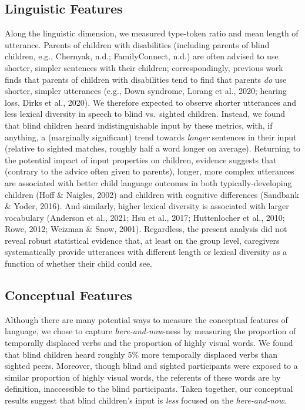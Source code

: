 \documentclass[
  man,floatsintext]{apa6}
\begin{document}
\hypertarget{linguistic-features-2}{%
\subsection{Linguistic Features}\label{linguistic-features-2}}

Along the linguistic dimension, we measured type-token ratio and mean length of utterance. Parents of children with disabilities (including parents of blind children, e.g., Chernyak, n.d.; FamilyConnect, n.d.) are often advised to use shorter, simpler sentences with their children; correspondingly, previous work finds that parents of children with disabilities tend to find that parents \emph{do} use shorter, simpler utterances (e.g., Down syndrome, Lorang et al., 2020; hearing loss, Dirks et al., 2020). We therefore expected to observe shorter utterances and less lexical diversity in speech to blind vs.~sighted children. Instead, we found that blind children heard indistinguishable input by these metrics, with, if anything, a (marginally significant) trend towards \emph{longer} sentences in their input (relative to sighted matches, roughly half a word longer on average). Returning to the potential impact of input properties on children, evidence suggests that (contrary to the advice often given to parents), longer, more complex utterances are associated with better child language outcomes in both typically-developing children (Hoff \& Naigles, 2002) and children with cognitive differences (Sandbank \& Yoder, 2016). And similarly, higher lexical diversity is associated with larger vocabulary (Anderson et al., 2021; Hsu et al., 2017; Huttenlocher et al., 2010; Rowe, 2012; Weizman \& Snow, 2001). Regardless, the present analysis did not reveal robust statistical evidence that, at least on the group level, caregivers systematically provide utterances with different length or lexical diversity as a function of whether their child could see.

\hypertarget{conceptual-features-2}{%
\subsection{Conceptual Features}\label{conceptual-features-2}}

Although there are many potential ways to measure the conceptual features of language, we chose to capture \emph{here-and-now}-ness by measuring the proportion of temporally displaced verbs and the proportion of highly visual words. We found that blind children heard roughly 5\% more temporally displaced verbs than sighted peers. Moreover, though blind and sighted participants were exposed to a similar proportion of highly visual words, the referents of these words are by definition, inaccessible to the blind participants. Taken together, our conceptual results suggest that blind children's input is \emph{less} focused on the \emph{here-and-now}.
\end{document}

